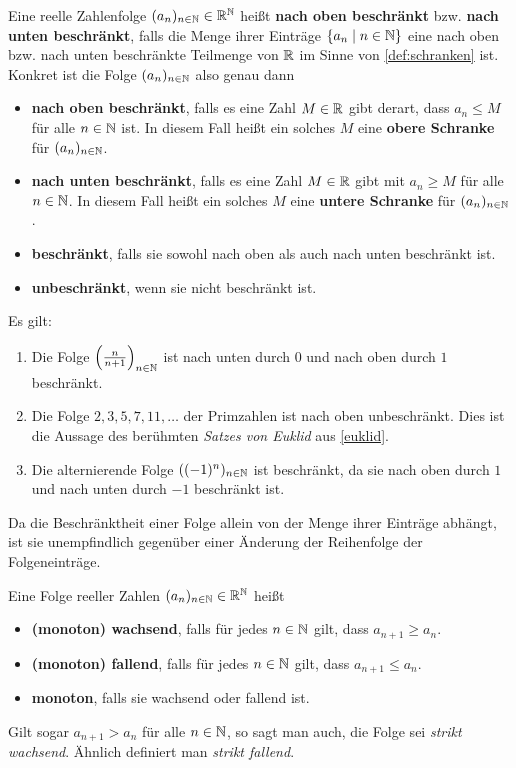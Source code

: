 \begin{de}[Beschränktheit] 
    Eine reelle Zahlenfolge $(a_n)_{n\in \mathbb N}\in \mathbb R^\mathbb N$ heißt \textbf{nach oben beschränkt} bzw. \textbf{nach unten beschränkt}, falls die Menge ihrer Einträge $\{a_n\mid n\in \mathbb N\}$ eine nach oben bzw. nach unten beschränkte Teilmenge von $\mathbb R$ im Sinne von \cref{def:schranken} ist. Konkret ist die Folge $(a_n)_{n\in \mathbb N}$ also genau dann
    \begin{itemize}
        \item \textbf{nach oben beschränkt}, falls es eine Zahl $M\in \mathbb R$ gibt derart, dass $a_n\le M$ für alle $n\in \mathbb N$ ist. In diesem Fall heißt ein solches $M$ eine \textbf{obere Schranke} für $(a_n)_{n\in \mathbb N}$.
        \item \textbf{nach unten beschränkt}, falls es eine Zahl $M\in \mathbb R$ gibt mit $a_n\ge M$ für alle $n\in \mathbb N$. In diesem Fall heißt ein solches $M$ eine \textbf{untere Schranke} für $(a_n)_{n\in \mathbb N}$.
        \item \textbf{beschränkt}, falls sie sowohl nach oben als auch nach unten beschränkt ist.
        \item \textbf{unbeschränkt}, wenn sie nicht beschränkt ist.
    \end{itemize}
\end{de}


\begin{bsp} Es gilt:
    \begin{enumerate}
        \item Die Folge $\left(\frac{n}{n+1}\right)_{n\in \mathbb N}$ ist nach unten durch $0$ und nach oben durch $1$ beschränkt.
        \item Die Folge $2,3,5,7,11,\dots$ der Primzahlen ist nach oben unbeschränkt. Dies ist die Aussage des berühmten \emph{Satzes von Euklid} aus \cref{euklid}.
        \item Die alternierende Folge $((-1)^n)_{n\in \mathbb N}$ ist beschränkt, da sie nach oben durch $1$ und nach unten durch $-1$ beschränkt ist.
    \end{enumerate}
    Da die Beschränktheit einer Folge allein von der Menge ihrer Einträge abhängt, ist sie unempfindlich gegenüber einer Änderung der Reihenfolge der Folgeneinträge.
\end{bsp}


\begin{de}[Monotonie]   
    Eine Folge reeller Zahlen $(a_n)_{n\in \mathbb N}\in \mathbb R^\mathbb N$ heißt
    \begin{itemize}
        \item \textbf{(monoton) wachsend}, falls für jedes $n\in \mathbb N$ gilt, dass $a_{n+1}\ge a_n$.
        \item \textbf{(monoton) fallend}, falls für jedes $n\in \mathbb N$ gilt, dass $a_{n+1}\le a_n$.
        \item \textbf{monoton}, falls sie wachsend oder fallend ist.
    \end{itemize}
    Gilt sogar $a_{n+1}>a_n$ für alle $n\in \mathbb N$, so sagt man auch, die Folge sei \emph{strikt wachsend}. Ähnlich definiert man \emph{strikt fallend}.
\end{de}


